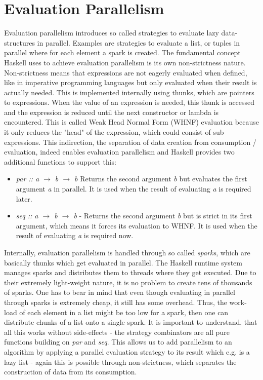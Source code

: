 \section{Evaluation Parallelism}
Evaluation parallelism introduces so called strategies to evaluate lazy data-structures in parallel. Examples are strategies to evaluate a list, or tuples in parallel where for each element a spark is created. The fundamental concept Haskell uses to achieve evaluation parallelism is its own non-strictness nature. Non-strictness means that expressions are not eagerly evaluated when defined, like in imperative programming languages but only evaluated when their result is actually needed. This is implemented internally using thunks, which are pointers to expressions. When the value of an expression is needed, this thunk is accessed and the expression is reduced until the next constructor or lambda is encountered. This is called Weak Head Normal Form (WHNF) evaluation because it only reduces the "head" of the expression, which could consist of sub expressions. This indirection, the separation of data creation from consumption / evaluation, indeed enables evaluation parallelism and Haskell provides two additional functions to support this:

\begin{itemize}
	\item \textit{par :: a $\rightarrow$ b $\rightarrow$ b} Returns the second argument \textit{b} but evaluates the first argument \textit{a} in parallel. It is used when the result of evaluating \textit{a} is required later.
	
	\item \textit{seq :: a $\rightarrow$ b $\rightarrow$ b} - Returns the second argument \textit{b} but is strict in its first argument, which means it forces its evaluation to WHNF. It is used when the result of evaluating \textit{a} is required now.
\end{itemize}

Internally, evaluation parallelism is handled through so called \textit{sparks}, which are basically thunks which get evaluated in parallel. The Haskell runtime system manages sparks and distributes them to threads where they get executed. Due to their extremely light-weight nature, it is no problem to create tens of thousands of sparks. One has to bear in mind that even though evaluating in parallel through sparks is extremely cheap, it still has some overhead. Thus, the work-load of each element in a list might be too low for a spark, then one can distribute chunks of a list onto a single spark.
It is important to understand, that all this works without side-effects - the strategy combinators are all pure functions building on \textit{par} and \textit{seq}. This allows us to add parallelism to an algorithm by applying a parallel evaluation strategy to its result which e.g. is a lazy list - again this is possible through non-strictness, which separates the construction of data from its consumption.

